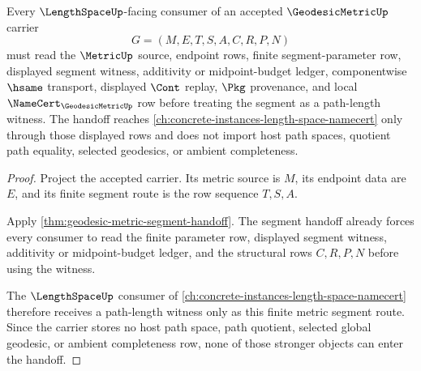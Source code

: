 \begin{theorem}
\label{thm:geodesic-metric-path-length-handoff}
Every $\LengthSpaceUp$-facing consumer of an accepted $\GeodesicMetricUp$ carrier
$$
G=(M,E,T,S,A,C,R,P,N)
$$
must read the $\MetricUp$ source, endpoint rows, finite segment-parameter row, displayed segment witness, additivity or midpoint-budget ledger, componentwise $\hsame$ transport, displayed $\Cont$ replay, $\Pkg$ provenance, and local $\NameCert_{\GeodesicMetricUp}$ row before treating the segment as a path-length witness. The handoff reaches \autoref{ch:concrete-instances-length-space-namecert} only through those displayed rows and does not import host path spaces, quotient path equality, selected geodesics, or ambient completeness.
\end{theorem}
\begin{proof}
Project the accepted carrier. Its metric source is $M$, its endpoint data are $E$, and its finite segment route is the row sequence $T,S,A$.

Apply \autoref{thm:geodesic-metric-segment-handoff}. The segment handoff already forces every consumer to read the finite parameter row, displayed segment witness, additivity or midpoint-budget ledger, and the structural rows $C,R,P,N$ before using the witness.

The $\LengthSpaceUp$ consumer of \autoref{ch:concrete-instances-length-space-namecert} therefore receives a path-length witness only as this finite metric segment route. Since the carrier stores no host path space, path quotient, selected global geodesic, or ambient completeness row, none of those stronger objects can enter the handoff.
\end{proof}


\begin{closurestatus}{\GeodesicMetricUp}
  \theoryclosure{\seedClosure}
  \formalstatus{\unformalizedV}
\end{closurestatus}
